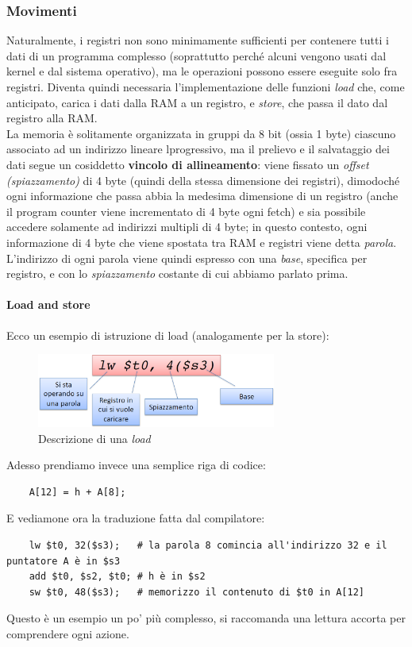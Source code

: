 \documentclass[class=book, crop=false]{standalone}
\begin{document}
\subsubsection{Movimenti}Naturalmente, i registri non sono minimamente sufficienti per contenere tutti i dati di un programma complesso (soprattutto perché alcuni vengono usati dal kernel e dal sistema operativo), ma le operazioni possono essere eseguite solo fra registri. Diventa quindi necessaria l'implementazione delle funzioni \emph{load} che, come anticipato, carica i dati dalla RAM a un registro, e \emph{store}, che passa il dato dal registro alla RAM.\\
La memoria è solitamente organizzata in gruppi da 8 bit (ossia 1 byte) ciascuno associato ad  un indirizzo lineare lprogressivo, ma il prelievo e il salvataggio dei dati segue un cosiddetto \textbf{vincolo di allineamento}: viene fissato un \emph{offset (spiazzamento)} di 4 byte (quindi della stessa dimensione dei registri), dimodoché ogni informazione che passa abbia la medesima dimensione di un registro (anche il program counter viene incrementato di 4 byte ogni fetch) e sia possibile accedere solamente ad indirizzi multipli di 4 byte; in questo contesto, ogni informazione di 4 byte che viene spostata tra RAM e registri viene detta \emph{parola}.\\
L'indirizzo di ogni parola viene quindi espresso con una \emph{base}, specifica per registro, e con lo \emph{spiazzamento} costante di cui abbiamo parlato prima.

\paragraph{Load and store}
Ecco un esempio di istruzione di load (analogamente per la store):
\begin{figure}[H]
	\centering
	\includegraphics[width=0.7\textwidth,keepaspectratio]{load}
	\caption{Descrizione di una \emph{load}}
\end{figure}
Adesso prendiamo invece una semplice riga di codice:
\begin{verbatim}
	A[12] = h + A[8];
\end{verbatim}
E vediamone ora la traduzione fatta dal compilatore:
\begin{verbatim}
	lw $t0, 32($s3);   # la parola 8 comincia all'indirizzo 32 e il puntatore A è in $s3
	add $t0, $s2, $t0; # h è in $s2
	sw $t0, 48($s3);   # memorizzo il contenuto di $t0 in A[12]
\end{verbatim}
Questo è un esempio un po' più complesso, si raccomanda una lettura accorta per comprendere ogni azione.
\end{document}
